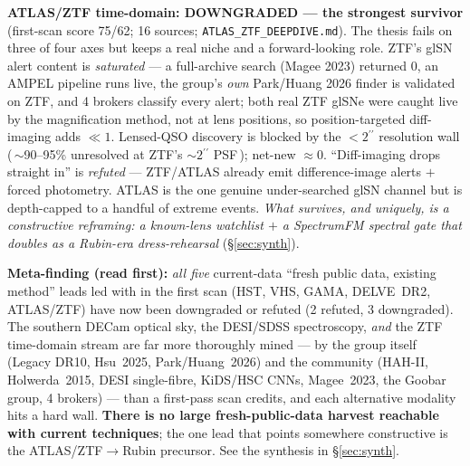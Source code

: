 \documentclass[11pt,letterpaper]{article}
\providecommand{\arcsec}{\ensuremath{^{\prime\prime}}}
\begin{document}
\textbf{ATLAS/ZTF time-domain: DOWNGRADED --- the strongest survivor} (first-scan score 75/62; 16
sources; \texttt{ATLAS\_ZTF\_DEEPDIVE.md}). The thesis fails on three of four axes but keeps a real
niche and a forward-looking role. ZTF's glSN alert content is \emph{saturated} --- a full-archive
search (Magee 2023) returned 0, an AMPEL pipeline runs live, the group's \emph{own} Park/Huang 2026
finder is validated on ZTF, and 4 brokers classify every alert; both real ZTF glSNe were caught live
by the magnification method, not at lens positions, so position-targeted diff-imaging adds $\ll1$.
Lensed-QSO discovery is blocked by the $<2\arcsec$ resolution wall (\,$\sim$90--95\% unresolved at
ZTF's $\sim2\arcsec$ PSF\,); net-new $\approx0$. ``Diff-imaging drops straight in'' is \emph{refuted}
--- ZTF/ATLAS already emit difference-image alerts $+$ forced photometry. ATLAS is the one genuine
under-searched glSN channel but is depth-capped to a handful of extreme events. \emph{What survives,
and uniquely, is a constructive reframing: a known-lens watchlist $+$ a SpectrumFM spectral gate
that doubles as a Rubin-era dress-rehearsal} (\S\ref{sec:synth}).

\textbf{Meta-finding (read first):} \emph{all five} current-data ``fresh public data, existing
method'' leads led with in the first scan (HST, VHS, GAMA, DELVE~DR2, ATLAS/ZTF) have now been
downgraded or refuted (2 refuted, 3 downgraded). The southern DECam optical sky, the DESI/SDSS
spectroscopy, \emph{and} the ZTF time-domain stream are far more thoroughly mined --- by the group
itself (Legacy DR10, Hsu~2025, Park/Huang~2026) and the community (HAH-II, Holwerda~2015, DESI
single-fibre, KiDS/HSC CNNs, Magee~2023, the Goobar group, 4 brokers) --- than a first-pass scan
credits, and each alternative modality hits a hard wall. \textbf{There is no large fresh-public-data
harvest reachable with current techniques}; the one lead that points somewhere constructive is the
ATLAS/ZTF$\to$Rubin precursor. See the synthesis in \S\ref{sec:synth}.

\end{document}
